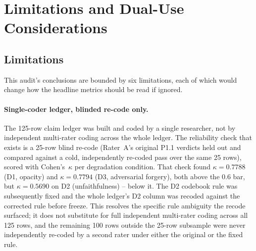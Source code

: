 %

\section{Limitations and Dual-Use Considerations}
\label{app:limitations}

\subsection*{Limitations}

This audit's conclusions are bounded by six limitations, each of which would
change how the headline metrics should be read if ignored.

\paragraph{Single-coder ledger, blinded re-code only.} The 125-row claim
ledger was built and coded by a single researcher, not by independent
multi-rater coding across the whole ledger. The reliability check that exists
is a 25-row blind re-code (Rater~A's original P1.1 verdicts held out and
compared against a cold, independently re-coded pass over the same 25 rows),
scored with Cohen's~$\kappa$ per degradation condition. That check found
$\kappa = 0.7788$ (D1, opacity) and $\kappa = 0.7794$ (D3, adversarial
forgery), both above the 0.6 bar, but $\kappa = 0.5690$ on D2
(unfaithfulness) -- below it. The D2 codebook rule was subsequently fixed and
the whole ledger's D2 column was recoded against the corrected rule before
freeze. This resolves the specific rule ambiguity the recode surfaced; it
does not substitute for full independent multi-rater coding across all 125
rows, and the remaining 100 rows outside the 25-row subsample were never
independently re-coded by a second rater under either the original or the
fixed rule.

